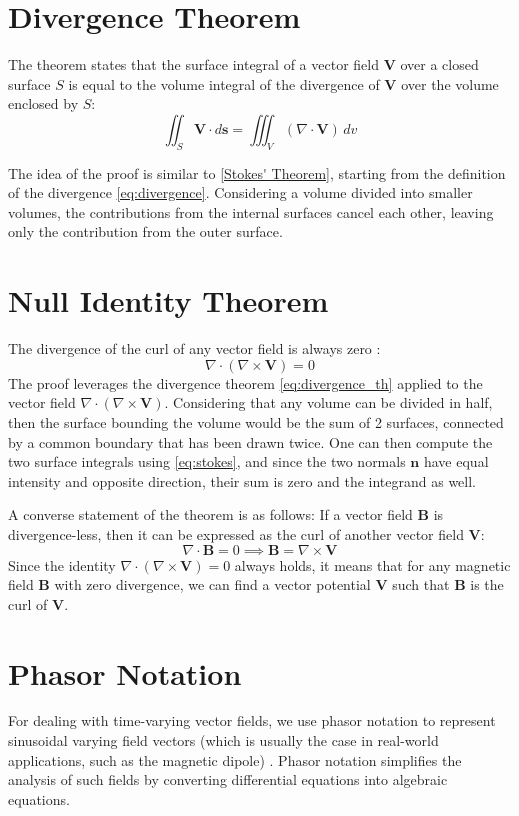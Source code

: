\section{Divergence Theorem}
The theorem states that the surface integral of a vector field \(\mathbf{V}\) 
over a closed surface \(S\) is equal to the volume integral of the divergence of 
\(\mathbf{V}\) over the volume enclosed by \(S\):
\begin{equation}
\iint_S\mathbf{V} \cdot d\mathbf{s} = \iiint_V (\nabla \cdot \mathbf{V}) \, dv
\label{eq:divergence_th}
\end{equation}

The idea of the proof is similar to \ref{Stokes' Theorem}, starting from the 
definition of the divergence \ref{eq:divergence}. Considering a volume divided 
into smaller volumes, the contributions from the internal surfaces cancel each 
other, leaving only the contribution from the outer surface.

\section{Null Identity Theorem}
The divergence of the curl of any vector field is always zero \cite{book-magnetism}:
\begin{equation}
\nabla \cdot (\nabla \times \mathbf{V}) = 0 
\label{eq:null}
\end{equation}
The proof leverages the divergence theorem \ref{eq:divergence_th} applied to the 
vector field \(\nabla \cdot (\nabla \times \mathbf{V})\). Considering that any 
volume can be divided in half, then the surface bounding the volume would be the 
sum of 2 surfaces, connected by a common boundary that has been drawn twice. One 
can then compute the two surface integrals using \ref{eq:stokes}, and since the 
two normals \(\mathbf{n}\) have equal intensity and opposite direction, their sum 
is zero and the integrand as well.

A converse statement of the theorem is as follows: 
If a vector field \(\mathbf{B}\) is divergence-less, then it can be expressed as 
the curl of another vector field \(\mathbf{V}\):
\[
\nabla \cdot \mathbf{B} = 0 \implies \mathbf{B} = \nabla \times \mathbf{V}
\]
Since the identity \(\nabla \cdot (\nabla \times \mathbf{V}) = 0\) always holds, 
it means that for any magnetic field \(\mathbf{B}\) with zero divergence, we can 
find a vector potential \(\mathbf{V}\) such that \(\mathbf{B}\) is the curl of 
\(\mathbf{V}\).

\section{Phasor Notation} \label{Phasor Notation}
For dealing with time-varying vector fields, we use phasor notation to represent 
sinusoidal varying field vectors (which is usually the case in real-world 
applications, such as the magnetic dipole) \cite{book-magnetism}. Phasor notation 
simplifies the analysis of such fields by converting differential equations into 
algebraic equations.

